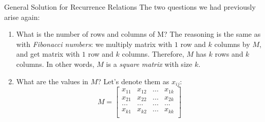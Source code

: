\documentclass{beamer}
\begin{document}
\begin{frame}{General Solution for Recurrence Relations}
  The two questions we had previously arise again:
  \pause
  \begin{enumerate}
    \item What is the number of rows and columns of M?
      \pause \newline
       The reasoning is the same as with \textit{Fibonacci numbers}:
       \newline
       we multiply matrix with $1$ row and $k$ columns by $M$, and get matrix with $1$ row and $k$ columns.
       \pause \newline
      Therefore, $M$ has $k$ rows and $k$ columns.
      In other words, $M$ is a \textit{square matrix} with size $k$.
    \pause
    \item What are the values in $M$?
      \pause Let's denote them as $x_{ij}$:
      \newline
      \[
        M = 
        \left[ {
          \begin{array}{cccc}
            x_{11} & x_{12} & ... & x_{1k} \\
            x_{21} & x_{22} & ... & x_{2k} \\
            ... & ... & ... & ... \\
            x_{k1} & x_{k2} & ... & x_{kk} \\
          \end{array} } 
        \right]
      \]

  \end{enumerate}
\end{frame}
\end{document}
